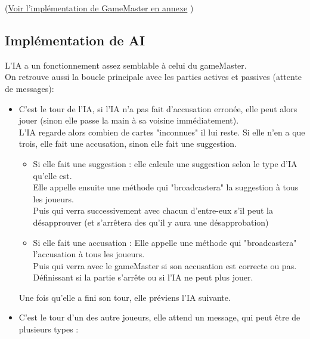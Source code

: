 \documentclass[a4paper,10pt]{article}
\begin{document}
		(\hyperlink{GameMasterImplementation}{Voir l'implémentation de GameMaster en annexe} )		
		
		

	
	\subsection{Implémentation de AI}
	L'IA a un fonctionnement assez semblable à celui du gameMaster.\\
	On retrouve aussi la boucle principale avec les parties actives et passives (attente de messages):
		\begin{itemize}
			\item C'est le tour de l'IA, si l'IA n'a pas fait d'accusation erronée, elle peut alors jouer (sinon elle passe la main à sa voisine immédiatement).\\
				L'IA regarde alors combien de cartes "inconnues" il lui reste. Si elle n'en a que trois, elle fait une accusation, sinon elle fait une suggestion.
				\begin{itemize}
					\item Si elle fait une suggestion : elle calcule une suggestion selon le type d'IA qu'elle est.\\
						Elle appelle ensuite une méthode qui "broadcastera" la suggestion à tous les joueurs.\\
						 Puis qui verra successivement avec chacun d'entre-eux s'il peut la désapprouver (et s'arrêtera des qu'il y aura une désapprobation)
					\item Si elle fait une accusation : Elle appelle une méthode qui "broadcastera" l'accusation à tous les joueurs.\\
						 Puis qui verra avec le gameMaster si son accusation est correcte ou pas. Définissant si la partie s'arrête ou si l'IA ne peut plus jouer.
				\end{itemize}
				Une fois qu'elle a fini son tour, elle préviens l'IA suivante.
			\item C'est le tour d'un des autre joueurs, elle attend un message, qui peut être de plusieurs types :

\end{itemize}
\end{document}
